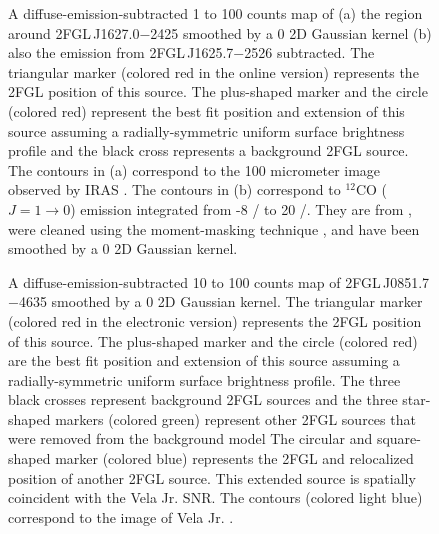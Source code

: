 \documentclass[12pt,preprint]{aastex}
\newif\ifcolorfigure
\newcommand{\gev}{\text{GeV}\xspace}
\newcommand{\tev}{\text{TeV}\xspace}
\newcommand{\s}{\text{s}\xspace}
\newcommand{\km}{\text{km}\xspace}
\begin{document}
\begin{figure}
    \ifcolorfigure
      \plotone{source_plots/source_Ophiuchus_color.eps}
    \else
    \fi
  \caption{
  A diffuse-emission-subtracted 1 \gev to 100 \gev counts map of (a) the region
  around 2FGL\,J1627.0$-$2425 smoothed by a 0 2D Gaussian kernel (b)
  also the emission from 2FGL\,J1625.7$-$2526
  subtracted.  The triangular marker 
  (colored red in the
  online version) represents the 2FGL position of this source.
  The plus-shaped marker and the circle (colored red) 
  represent the best fit position and extension of this
  source assuming a radially-symmetric uniform surface brightness profile
  and the black cross represents a background 2FGL source. 
  The
  contours in (a) correspond to the 100 micrometer image observed by
  IRAS \citep{iras_rho_ophiuci}.  The contours in (b) correspond to
  ${}^{12}\text{CO}$ ($J=1\rightarrow 0$) emission integrated from -8 \km/\s
  to 20 \km/\s.  They are from \cite{co_rho_ophiuci}, were cleaned using
  the moment-masking technique \citep{masking_moment_2011}, and have
  been smoothed by a 0 2D Gaussian kernel.
  }\label{1FGL_J1628.6-2419c}
\end{figure}



\begin{figure}
    \ifcolorfigure
      \plotone{source_plots/source_Vela_Jr_color.eps}
    \else
    \fi
  \caption{A diffuse-emission-subtracted 10 \gev to 100 \gev counts map of
  2FGL\,J0851.7$-$4635 smoothed by a 0 2D Gaussian
  kernel. The triangular marker (colored red in the electronic version)
  represents the 2FGL position of this source.  The plus-shaped marker
  and the circle (colored red) are the best fit position and extension of
  this source assuming a radially-symmetric uniform surface brightness profile.
  The three black crosses represent background 2FGL sources
  and the three star-shaped markers (colored green) represent other 2FGL sources
  that were removed from the background model 
  The circular and square-shaped
  marker (colored blue) represents the 2FGL and relocalized position of another 2FGL source.  
  This extended source is spatially
  coincident with the Vela Jr. SNR.  The contours (colored light blue)
  correspond to the \tev image of Vela Jr.
  \citep{vela_jr_hess}.
  }\label{Vela_Jr}
\end{figure}
\end{document}
